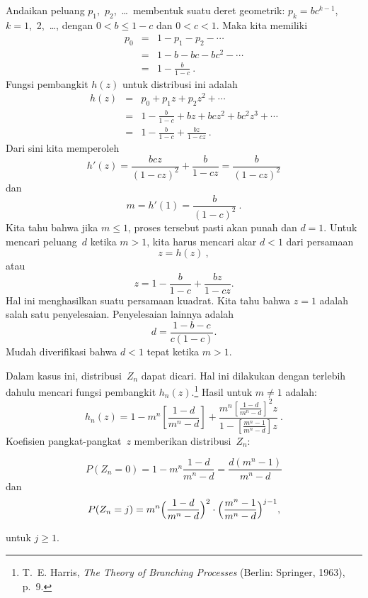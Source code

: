\begin{example}\label{exam 10.2.4}
Andaikan peluang $p_1$,~$p_2$,~\ldots\ membentuk suatu deret geometrik:
$p_k = bc^{k - 1}$, $k = 1$,~2,~\ldots, dengan $0 < b \leq 1 - c$ dan $0 < c < 1$. Maka kita memiliki
\begin{eqnarray*}
p_0 &=& 1 - p_1 - p_2 -\cdots \\
    &=& 1 - b - bc - bc^2 -\cdots \\
    &=& 1 - \frac b{1 - c}\ .
\end{eqnarray*}
Fungsi pembangkit $h(z)$ untuk distribusi ini adalah
\begin{eqnarray*}
h(z) &=& p_0 + p_1z + p_2z^2 +\cdots \\
     &=& 1 - \frac b{1 - c} + bz + bcz^2 + bc^2z^3 +\cdots \\
     &=& 1 - \frac b{1 - c} + \frac{bz}{1 - cz}\ .
\end{eqnarray*}
Dari sini kita memperoleh
$$
h'(z) = \frac{bcz}{(1 - cz)^2} + \frac b{1 - cz} = \frac b{(1 - cz)^2}
$$
dan
$$
m = h'(1) = \frac b{(1 - c)^2}\ .
$$
Kita tahu bahwa jika $m \leq 1$, proses tersebut pasti akan punah dan $d = 1$.  Untuk
mencari peluang~$d$ ketika $m > 1$, kita harus mencari akar $d < 1$ dari persamaan
$$
z = h(z)\ ,
$$
atau
$$
z = 1 - \frac b{1 - c} + \frac{bz}{1 - cz}.
$$
Hal ini menghasilkan suatu persamaan kuadrat.  Kita tahu bahwa $z = 1$ adalah salah satu penyelesaian. 
Penyelesaian lainnya adalah
$$
d = \frac{1 - b - c}{c(1 - c)}.
$$
Mudah diverifikasi bahwa $d < 1$ tepat ketika $m > 1$.

Dalam kasus ini, distribusi~$Z_n$ dapat dicari.  Hal ini dilakukan dengan
terlebih dahulu mencari fungsi pembangkit $h_n(z)$.\footnote{T.~E. Harris, {\it
The Theory of Branching Processes} (Berlin: Springer, 1963), p.~9.}  Hasil
untuk $m \ne 1$ adalah:
$$
h_n(z) = 1 - m^n \left[\frac{1 - d}{m^n - d}\right] + 
\frac{m^n \left[\frac{1 - d}{m^n - d}\right]^2 z}
{1 - \left[\frac{m^n - 1}{m^n - d}\right]z}\ .
$$
Koefisien pangkat-pangkat~$z$ memberikan distribusi~$Z_n$:
 
$$P(Z_n = 0) = 1 - m^n\frac{1 - d}{m^n - d} = \frac{d(m^n - 1)}{m^n - d}$$
\noindent dan 
$$P(Z_n = j) = m^n \Bigl(\frac{1 - d}{m^n - d}\Bigr)^2 \cdot 
\Bigl(\frac{m^n - 1}{ m^n - d}\Bigr)^{j - 1},$$

\noindent untuk $j \geq 1$.
\end{example}

